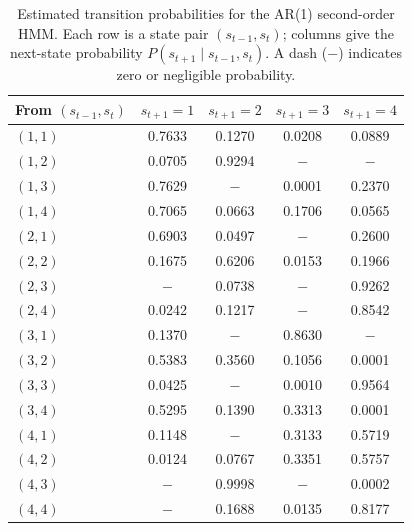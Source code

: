 \begin{table}[H]
\centering
\begin{tabular}{lcccc}
\hline
From $(s_{t-1}, s_t)$ & $s_{t+1} = 1$ & $s_{t+1} = 2$ & $s_{t+1} = 3$ & $s_{t+1} = 4$ \\
\hline
$(1, 1)$ & 0.7633 & 0.1270 & 0.0208 & 0.0889 \\
$(1, 2)$ & 0.0705 & 0.9294 & $-$ & $-$ \\
$(1, 3)$ & 0.7629 & $-$ & 0.0001 & 0.2370 \\
$(1, 4)$ & 0.7065 & 0.0663 & 0.1706 & 0.0565 \\
\hline
$(2, 1)$ & 0.6903 & 0.0497 & $-$ & 0.2600 \\
$(2, 2)$ & 0.1675 & 0.6206 & 0.0153 & 0.1966 \\
$(2, 3)$ & $-$ & 0.0738 & $-$ & 0.9262 \\
$(2, 4)$ & 0.0242 & 0.1217 & $-$ & 0.8542 \\
\hline
$(3, 1)$ & 0.1370 & $-$ & 0.8630 & $-$ \\
$(3, 2)$ & 0.5383 & 0.3560 & 0.1056 & 0.0001 \\
$(3, 3)$ & 0.0425 & $-$ & 0.0010 & 0.9564 \\
$(3, 4)$ & 0.5295 & 0.1390 & 0.3313 & 0.0001 \\
\hline
$(4, 1)$ & 0.1148 & $-$ & 0.3133 & 0.5719 \\
$(4, 2)$ & 0.0124 & 0.0767 & 0.3351 & 0.5757 \\
$(4, 3)$ & $-$ & 0.9998 & $-$ & 0.0002 \\
$(4, 4)$ & $-$ & 0.1688 & 0.0135 & 0.8177 \\
\hline
\end{tabular}
\caption{Estimated transition probabilities for the AR(1) second-order HMM. Each row is a state pair $(s_{t-1}, s_t)$; columns give the next-state probability $P(s_{t+1} \mid s_{t-1}, s_t)$. A dash ($-$) indicates zero or negligible probability.}
\label{tab:second_order_hmm_transition}
\end{table}
